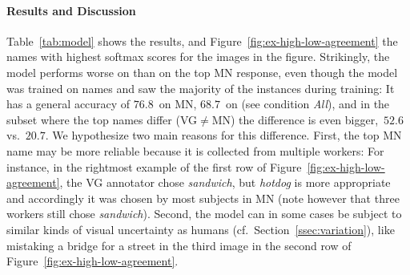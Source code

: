 \paragraph{Results and Discussion}
Table~\ref{tab:model} shows the results, and Figure~\ref{fig:ex-high-low-agreement} the names with highest softmax scores for the images in the figure.
Strikingly, the model performs worse on \vg than on the top MN response, even though the model was trained on \vg names and saw the majority of the instances during training: It has a general accuracy of $76.8$\ on MN, $68.7$\ on \vg (see condition \textit{All}), and in the subset where the top names differ (VG$\neq$MN) the difference is even bigger,\ $52.6$ vs.\ $20.7$.
We hypothesize two main reasons for this difference.
First, the top MN name may be more reliable because it is collected from multiple workers: For instance, in the rightmost example of the first row of Figure~\ref{fig:ex-high-low-agreement}, the VG annotator chose \textsl{sandwich}, but \textsl{hotdog} is more appropriate and accordingly it was chosen by most subjects in MN (note however that three workers still chose \textsl{sandwich}).
Second, the model can in some cases be subject to similar kinds of visual uncertainty as humans (cf.\ Section\ \ref{ssec:variation}), like mistaking a bridge for a street in the third image in the second row of Figure~\ref{fig:ex-high-low-agreement}.

